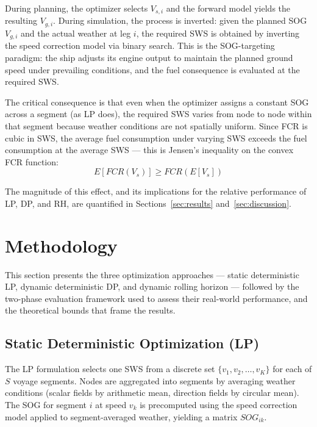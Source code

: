 \documentclass[review]{elsarticle}
\begin{document}
During planning, the optimizer selects $V_{s,i}$ and the forward model yields the resulting $V_{g,i}$. During simulation, the process is inverted: given the planned SOG $V_{g,i}$ and the actual weather at leg $i$, the required SWS is obtained by inverting the speed correction model via binary search. This is the SOG-targeting paradigm: the ship adjusts its engine output to maintain the planned ground speed under prevailing conditions, and the fuel consequence is evaluated at the required SWS.

The critical consequence is that even when the optimizer assigns a constant SOG across a segment (as LP does), the required SWS varies from node to node within that segment because weather conditions are not spatially uniform. Since FCR is cubic in SWS, the average fuel consumption under varying SWS exceeds the fuel consumption at the average SWS --- this is Jensen's inequality on the convex FCR function:
\begin{equation}
    E[FCR(V_s)] \geq FCR(E[V_s])
    \label{eq:jensen}
\end{equation}

The magnitude of this effect, and its implications for the relative performance of LP, DP, and RH, are quantified in Sections~\ref{sec:results} and~\ref{sec:discussion}.


\section{Methodology}
\label{sec:methodology}

This section presents the three optimization approaches --- static deterministic LP, dynamic deterministic DP, and dynamic rolling horizon --- followed by the two-phase evaluation framework used to assess their real-world performance, and the theoretical bounds that frame the results.

\subsection{Static Deterministic Optimization (LP)}
\label{sec:lp}

The LP formulation selects one SWS from a discrete set $\{v_1, v_2, \ldots, v_K\}$ for each of $S$ voyage segments. Nodes are aggregated into segments by averaging weather conditions (scalar fields by arithmetic mean, direction fields by circular mean). The SOG for segment $i$ at speed $v_k$ is precomputed using the speed correction model \cite{Yang2020} applied to segment-averaged weather, yielding a matrix $SOG_{ik}$.
\end{document}

